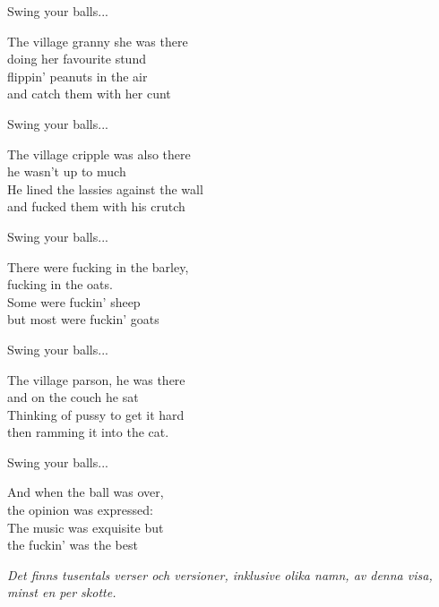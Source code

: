 \vspace{10pt}
Swing your balls...\par
\vspace{10pt}
The village granny she was there\\
doing her favourite stund\\
flippin' peanuts in the air\\
and catch them with her cunt\par
\vspace{10pt}
Swing your balls...\par
\vspace{10pt}
The village cripple was also there\\
he wasn't up to much\\
He lined the lassies against the wall\\
and fucked them with his crutch\par
\vspace{10pt}
Swing your balls...\par
\vspace{10pt}
There were fucking in the barley,\\
fucking in the oats.\\
Some were fuckin' sheep\\
but most were fuckin' goats\par
\vspace{10pt}
Swing your balls...\par
\vspace{10pt}
The village parson, he was there\\
and on the couch he sat\\
Thinking of pussy to get it hard\\
then ramming it into the cat.\par
\vspace{10pt}
Swing your balls...\par
\vspace{10pt}
And when the ball was over,\\
the opinion was expressed:\\
The music was exquisite but\\
the fuckin' was the best
\par
\vspace{10pt}
{\footnotesize\textit{Det finns tusentals verser och versioner, inklusive olika namn, av denna visa, minst en per skotte.}}

